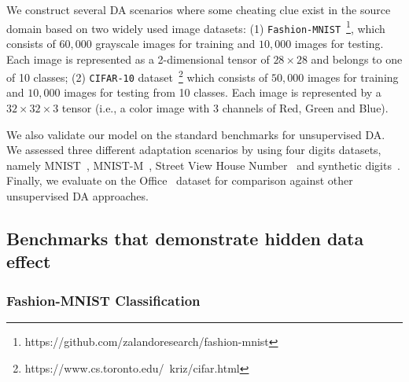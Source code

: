 \documentclass{article}
\newcommand{\elisa}[1]{\textbf{\color{red}Elisa: #1}}
\begin{document}
We construct several DA scenarios where some  cheating clue exist in the source domain based on two widely used image datasets: (1) \verb"Fashion-MNIST"~\footnote{https://github.com/zalandoresearch/fashion-mnist}, which consists of $60,000$ grayscale images for training and $10,000$ images for testing. Each image is represented as a 2-dimensional tensor of $28\times28$ and belongs to one of 10 classes; (2) \verb"CIFAR-10" dataset~\footnote{https://www.cs.toronto.edu/~kriz/cifar.html} which consists of $50,000$ images for training and $10,000$ images for testing from 10 classes. Each image is represented by a $32\times32\times3$ tensor (i.e., a color image with 3 channels of Red, Green and Blue). %

We also validate our model on the standard benchmarks for unsupervised DA. We assessed three different adaptation scenarios by using four digits datasets,  namely MNIST~\cite{lecun1998gradient}, MNIST-M~\cite{ganin2016domain}, Street View House Number~\cite{netzer2011reading} and synthetic digits~\cite{ganin2016domain}. Finally, we evaluate on the Office~\cite{saenko2010adapting} dataset for comparison against other unsupervised DA approaches.

\subsection{Benchmarks that demonstrate hidden data effect}


\subsubsection{Fashion-MNIST Classification}
\end{document}
